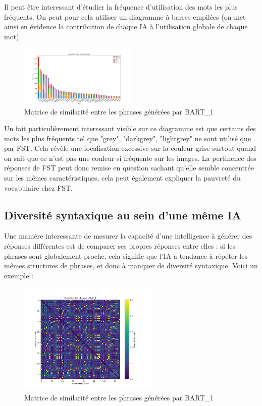 \documentclass[conference]{IEEEtran}
\begin{document}
Il peut être interessant d'étudier la fréquence d'utilisation des mots les plus fréquents. On peut pour cela utiliser un diagramme à barres empilées (on met ainsi en évidence la contribution de chaque IA à l'utilisation globale de chaque mot).

\vspace{5mm}

\begin{figure}[H]
\centering
\includegraphics[width=0.5\textwidth]{images/stacked_bars_most_used_words.png}
\caption{Matrice de similarité entre les phrases générées par BART\_1}
\end{figure}

\vspace{5mm}

Un fait particulièrement interessant visible sur ce diagramme est que certains des mots les plus fréquents tel que "grey", "darkgrey", "lightgrey" ne sont utilisé que par FST. Cela révèle une focalisation excessive sur la couleur grise surtout quand on sait que ce n'est pas une couleur si fréquente sur les images. 
La pertinence des réponses de FST peut donc remise en question sachant qu'elle semble concentrée sur les mêmes caractéristiques, cela peut également expliquer la pauvreté du vocabulaire chez FST.

\subsection {Diversité syntaxique au sein d'une même IA}

Une manière interessante de mesurer la capacité d'une intelligence à générer des réponses différentes est de comparer ses propres réponses entre elles : si les phrases sont globalement proche, cela signifie que l'IA a tendance à répéter les mêmes structures de phrases, et donc à manquer de diversité syntaxique.
Voici un exemple : 

\vspace{5mm}

\begin{figure}[H]
\centering
\includegraphics[width=0.6\textwidth]{images/diversity_matrix_bart_1.png}
\caption{Matrice de similarité entre les phrases générées par BART\_1}
\end{figure}
\end{document}
